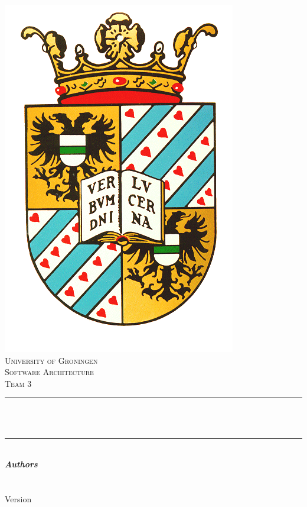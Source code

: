 

\begin{titlepage}
	\centering
    
    \vspace*{0.5 cm}
    \includegraphics[scale = 0.25]{images/rug.png}\\[1.0 cm]	%
    \textsc{\LARGE University of Groningen}\\[0.3cm]
	\textsc{\large {Software Architecture}}\\
	\textsc{\large {Team 3}} \\[2.0 cm]
	\rule{\linewidth}{0.2 mm} \\[0.4 cm]
	{ \huge \bfseries \thetitle}\\
	
	\rule{\linewidth}{0.2 mm} \\[1.5 cm]
			\textbf{\large\emph\textbf{Authors}}\\
			\theauthor
	\\[2 cm]	
	{\large \thedate}\\[0.25cm]
		Version \VersionNumber \\
		\renewcommand{\headrulewidth}{0pt}
	\vfill

	
\end{titlepage}


